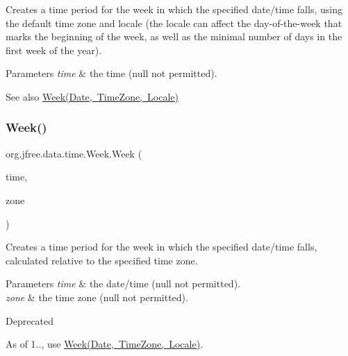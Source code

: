 Creates a time period for the week in which the specified date/time falls, using the default time zone and locale (the locale can affect the day-\/of-\/the-\/week that marks the beginning of the week, as well as the minimal number of days in the first week of the year).


\begin{DoxyParams}{Parameters}
{\em time} & the time ({\ttfamily null} not permitted).\\
\hline
\end{DoxyParams}
\begin{DoxySeeAlso}{See also}
\mbox{\hyperlink{classorg_1_1jfree_1_1data_1_1time_1_1_week_aa2e91a61def88a3f75f5bc316ba21272}{Week(\+Date, Time\+Zone, Locale)}} 
\end{DoxySeeAlso}
\mbox{\label{classorg_1_1jfree_1_1data_1_1time_1_1_week_a35ae2d91e07aa5bdb528cf22b2232b84}} 
\subsubsection{\texorpdfstring{Week()}{Week()}\hspace{0.1cm}{\footnotesize\ttfamily [5/6]}}
{\footnotesize\ttfamily org.\+jfree.\+data.\+time.\+Week.\+Week (\begin{DoxyParamCaption}\item[{Date}]{time,  }\item[{Time\+Zone}]{zone }\end{DoxyParamCaption})}

Creates a time period for the week in which the specified date/time falls, calculated relative to the specified time zone.


\begin{DoxyParams}{Parameters}
{\em time} & the date/time ({\ttfamily null} not permitted). \\
\hline
{\em zone} & the time zone ({\ttfamily null} not permitted).\\
\hline
\end{DoxyParams}
\begin{DoxyRefDesc}{Deprecated}
\item[\mbox{\hyperlink{deprecated__deprecated000284}{Deprecated}}]As of 1.., use \mbox{\hyperlink{classorg_1_1jfree_1_1data_1_1time_1_1_week_aa2e91a61def88a3f75f5bc316ba21272}{Week(\+Date, Time\+Zone, Locale)}}. \end{DoxyRefDesc}
\mbox{\label{classorg_1_1jfree_1_1data_1_1time_1_1_week_aa2e91a61def88a3f75f5bc316ba21272}} 
